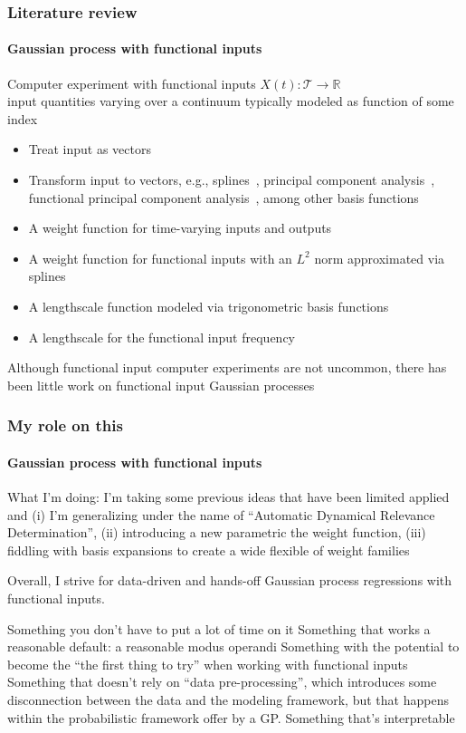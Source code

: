 \documentclass{snedecorbeamer}
\begin{document}
\begin{frame}
  \frametitle{Literature review}
  \framesubtitle{Gaussian process with functional inputs}

  Computer experiment with functional inputs $X(t):
  \mathcal{T}\to\mathbb{R}$ \\
  input quantities varying over a continuum typically modeled as function of
  some index

  \begin{itemize}[<+(1)->]
  \item Treat input as vectors~\citep{iooss2009}
  \item Transform input to vectors, e.g.,
    splines~\citep{betancourt2020,betancourt2020a}, principal component
    analysis~\citep{nanty2016}, functional principal component
    analysis~\citep{wang2017,wang2019}, among other basis
    functions~\citep{tan2019,li2021}
  \item A weight function for time-varying inputs and outputs~\citep{morris2012}
  \item A weight function for functional inputs with an $L^2$ norm approximated
    via splines \citep{muehlenstaedt2017}
  \item A lengthscale function modeled via trigonometric basis functions
    \citep{kuttubekova2019}
  \item A lengthscale for the functional input frequency \citep{chen2021}
  \end{itemize}

  \vfill{}
  \begin{exampleblock}{}
    Although functional input computer experiments are not uncommon,
    there has been little work on functional input Gaussian processes
  \end{exampleblock}
\end{frame}

\begin{frame}
  \frametitle{My role on this}
  \framesubtitle{Gaussian process with functional inputs}

  What I'm doing: I'm taking some previous ideas that have been limited applied
  and (i) I'm generalizing under the name of ``Automatic Dynamical Relevance
  Determination'', (ii) introducing a new parametric the weight function,
  (iii) fiddling with basis expansions to create a wide flexible of weight
  families

  Overall, I strive for data-driven and hands-off Gaussian process regressions
  with functional inputs.

  Something you don't have to put a lot of time on it
  Something that works a reasonable default: a reasonable modus operandi
  Something with the potential to become the ``the first thing to try'' when
  working with functional inputs
  Something that doesn't rely on ``data pre-processing'', which introduces some
disconnection between the data and the modeling framework, but that happens
within the probabilistic framework offer by a GP.
  Something that's interpretable
\end{frame}
\end{document}
